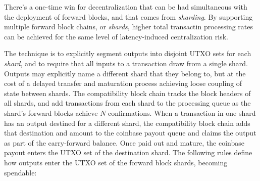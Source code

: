 There's a one-time win for decentralization that can be had
simultaneous with the deployment of forward blocks, and that comes
from \emph{sharding}.  By supporting multiple forward block chains,
or \emph{shards}, higher total transactin processing rates can be
achieved for the same level of latency-induced centralization risk.

The technique is to explicitly segment outputs into disjoint UTXO sets
for each \emph{shard}, and to require that all inputs to a transaction
draw from a single shard.  Outputs may explicitly name a different
shard that they belong to, but at the cost of a delayed transfer and
maturation process achieving loose coupling of state between shards.
The compatibility block chain tracks the block headers of all shards,
and add transactions from each shard to the processing queue as the
shard's forward blocks achieve $N$ confirmations.  When a transaction
in one shard has an output destined for a different shard, the
compatibility block chain adds that destination and amount to the
coinbase payout queue and claims the output as part of the
carry-forward balance.  Once paid out and mature, the coinbase payout
enters the UTXO set of the destination shard.  The following rules
define how outputs enter the UTXO set of the forward block shards,
becoming spendable:

